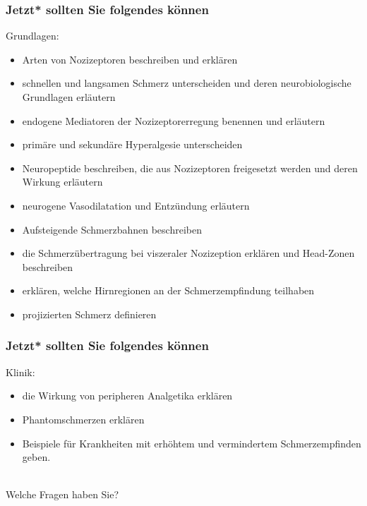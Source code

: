 \documentclass{beamer}
\begin{document}




\begin{frame}


 \frametitle{Jetzt* sollten Sie folgendes können}



\begin{block}{Grundlagen:}




\begin{itemize}

    \item 
    
Arten von Nozizeptoren beschreiben und erklären
    \item 
 schnellen und langsamen Schmerz unterscheiden und deren neurobiologische Grundlagen erläutern
    \item 
 endogene Mediatoren der Nozizeptorerregung benennen und erläutern
    \item 
 primäre und sekundäre Hyperalgesie unterscheiden
    \item 
 Neuropeptide beschreiben, die aus Nozizeptoren freigesetzt werden und deren Wirkung erläutern
    \item 
 neurogene Vasodilatation und Entzündung erläutern
    \item 
 Aufsteigende Schmerzbahnen beschreiben
    \item 
 die Schmerzübertragung bei viszeraler Nozizeption erklären und Head-Zonen beschreiben
    \item 
erklären, welche  Hirnregionen an der Schmerzempfindung teilhaben
    \item 
 projizierten Schmerz definieren

\end{itemize}


\end{block}

\end{frame}


\begin{frame}


 \frametitle{Jetzt* sollten Sie folgendes können}
 

\begin{block}{Klinik:}

\begin{itemize}
    
\item 
die Wirkung von peripheren Analgetika erklären
    \item 
 Phantomschmerzen erklären
    \item 
 Beispiele für Krankheiten mit erhöhtem und vermindertem Schmerzempfinden geben. 

\end{itemize}


\end{block}


$\,$\\[1cm]
\textcolor{theme}{Welche Fragen haben Sie?}


\end{frame}
\end{document}
